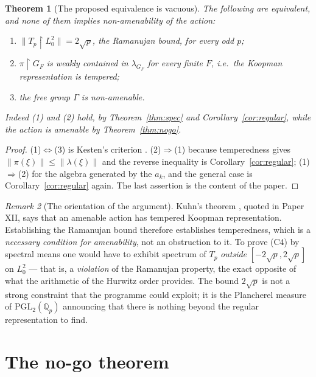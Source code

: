 \documentclass[11pt]{amsart}
\numberwithin{equation}{section}
\newtheorem{theorem}{Theorem}[section]
\theoremstyle{definition}
\theoremstyle{remark}
\newtheorem{remark}[theorem]{Remark}
\newcommand{\Q}{\mathbb{Q}}
\begin{document}
\begin{theorem}[The proposed equivalence is vacuous]\label{thm:vacuous}
The following are equivalent, and none of them implies non-amenability of the action:
\begin{enumerate}
\item $\|T_p\restriction L^2_0\|=2\sqrt p$, the Ramanujan bound, for every odd $p$;
\item $\pi\restriction G_F$ is weakly contained in $\lambda_{G_F}$ for every finite $F$, i.e.\ the
Koopman representation is tempered;
\item the free group $\Gamma$ is non-amenable.
\end{enumerate}
Indeed (1) and (2) \emph{hold}, by Theorem~\ref{thm:spec} and Corollary~\ref{cor:regular}, while
the action is amenable by Theorem~\ref{thm:nogo}.
\end{theorem}

\begin{proof}
(1)$\Leftrightarrow$(3) is Kesten's criterion \cite{Kesten}. (2)$\Rightarrow$(1) because temperedness gives
$\|\pi(\xi)\|\le\|\lambda(\xi)\|$ and the reverse inequality is Corollary~\ref{cor:regular};
(1)$\Rightarrow$(2) for the algebra generated by the $a_k$, and the general case is
Corollary~\ref{cor:regular} again. The last assertion is the content of the paper.
\end{proof}

\begin{remark}[The orientation of the argument]\label{rem:orientation}
Kuhn's theorem \cite{Kuhn}, quoted in Paper XII, says that an amenable action has tempered
Koopman representation. Establishing the Ramanujan bound therefore establishes temperedness, which is a
\emph{necessary condition for amenability}, not an obstruction to it. To prove (C4) by spectral
means one would have to exhibit spectrum of $T_p$ \emph{outside} $[-2\sqrt p,2\sqrt p]$ on
$L^2_0$ --- that is, a \emph{violation} of the Ramanujan property, the exact opposite of what the
arithmetic of the Hurwitz order provides. The bound $2\sqrt p$ is not a strong constraint that the
programme could exploit; it is the Plancherel measure of $\mathrm{PGL}_2(\Q_p)$ announcing that
there is nothing beyond the regular representation to find.
\end{remark}

\section{The no-go theorem}\label{sec:nogo}
\end{document}

